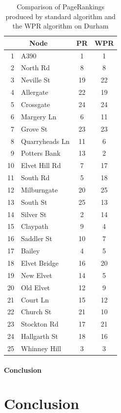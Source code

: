 \documentclass[11pt]{report}
\begin{document}
{\begin{table}[h] \caption{Comparison of PageRankings produced by standard algorithm and the WPR algorithm on Durham}
 \centering
 \begin{tabular} {r l| c c} 
 \multicolumn{2}{c|}{Node}& PR & WPR \\ [0.5ex] 
 \hline
 1&A390&1&1\\
 2&North Rd&8&8\\
 3&Neville St&19&22\\
 4&Allergate&22&19\\
 5&Crossgate&24&24\\
 6&Margery Ln&6&11\\
 7&Grove St&23&23\\
 8&Quarryheads Ln&11&6\\
 9&Potters Bank&13&2\\
 10&Elvet Hill Rd&7&17\\
 11&South Rd&5&18\\
 12&Milburngate&20&25\\
 13&South St&25&13\\
 14&Silver St&2&14\\
 15&Claypath&9&4\\
 16&Saddler St&10&7\\
 17&Bailey&4&5\\
 18&Elvet Bridge&16&20\\
 19&New Elvet&14&5\\
 20&Old Elvet&12&9\\
 21&Court Ln&15&12\\
 22&Church St&21&10\\
 23&Stockton Rd&17&21\\
 24&Hallgarth St&18&16\\
 25&Whinney Hill&3&3\\
 
 \end{tabular}
 \label{Table:Durham comparison}
\end{table}
\FloatBarrier

\subsubsection{Conclusion} \label{sec:Durham conc}

\chapter{Conclusion} \label{chap:Conclusion}
\newpage
{}

}
\end{document}
